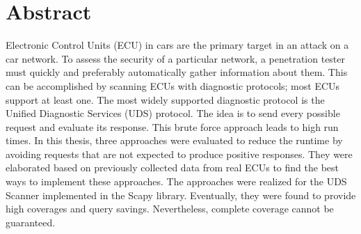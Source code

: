 \documentclass[
	11pt,			%
	a4paper,		%
	DIV=12,			%
	parskip=half,	%
	headsepline,	%
	bibliography=totoc,  %
	listof=totoc,    %
]{scrreprt}
\begin{document}
\renewcommand{\thepage}{\roman{page}}%

\maketitle
\thispagestyle{empty}



\chapter*{\centering Abstract}

Electronic Control Units (ECU) in cars are the primary target in an attack on a car network. To assess the security of a particular network, a penetration tester must quickly and preferably automatically gather information about them. This can be accomplished by scanning ECUs with diagnostic protocols; most ECUs support at least one. The most widely supported diagnostic protocol is the Unified Diagnostic Services (UDS) protocol. The idea is to send every possible request and evaluate its response. This brute force approach leads to high run times. In this thesis, three approaches were evaluated to reduce the runtime by avoiding requests that are not expected to produce positive responses. They were elaborated based on previously collected data from real ECUs to find the best ways to implement these approaches. The approaches were realized for the UDS Scanner implemented in the Scapy library. Eventually, they were found to provide high coverages and query savings. Nevertheless, complete coverage cannot be guaranteed.


\setcounter{tocdepth}{1} 	%
\thispagestyle{plain}
\tableofcontents

\clearpage
\renewcommand{\thepage}{\arabic{page}}%











\thispagestyle{plain}
\printunsrtglossary[type=\acronymtype]

\thispagestyle{plain}
\listoflistings

\thispagestyle{plain}
\listoffigures

\thispagestyle{plain}
\printbibliography

\appendix
\appendixpage


\end{document}
